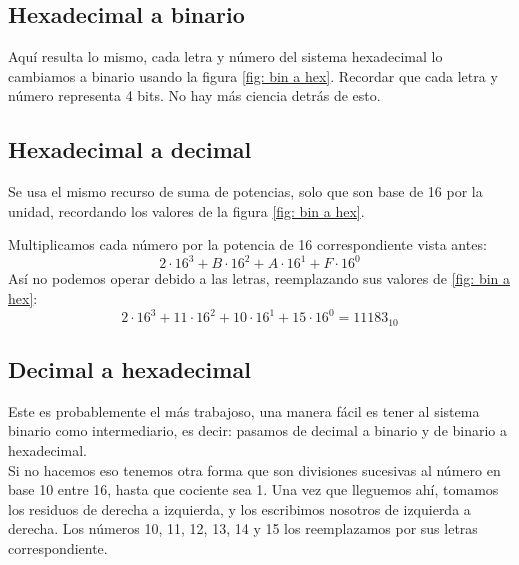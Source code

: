 \documentclass[
	12pt, %
	fleqn, %
	a4paper, %
]{LegrandOrangeBook}
\begin{document}
\subsection{Hexadecimal a binario}
Aquí resulta lo mismo, cada letra y número del sistema hexadecimal lo cambiamos a binario usando la figura \ref{fig: bin a hex}. Recordar que cada letra y número representa 4 bits. No hay más ciencia detrás de esto.
\subsection{Hexadecimal a decimal}
Se usa el mismo recurso de suma de potencias, solo que son base de 16 por la unidad, recordando los valores de la figura \ref{fig: bin a hex}.
\begin{example}
Multiplicamos cada número por la potencia de 16 correspondiente vista antes:
\begin{displaymath}
2\cdot 16^3 + B\cdot 16^2 + A\cdot 16^1 + F\cdot 16^0
\end{displaymath}
Así no podemos operar debido a las letras, reemplazando sus valores de \ref{fig: bin a hex}:
\begin{displaymath}
2\cdot 16^3 + 11\cdot 16^2 + 10\cdot 16^1 + 15\cdot 16^0=11 183_{10}
\end{displaymath}
\end{example}
\subsection{Decimal a hexadecimal}
Este es probablemente el más trabajoso, una manera fácil es tener al sistema binario como intermediario, es decir: pasamos de decimal a binario y de binario a hexadecimal.\\
Si no hacemos eso tenemos otra forma que son divisiones sucesivas al número en base 10 entre 16, hasta que cociente sea 1. Una vez que lleguemos ahí, tomamos los residuos de derecha a izquierda, y los escribimos nosotros de izquierda a derecha. Los números 10, 11, 12, 13, 14 y 15 los reemplazamos por sus letras correspondiente.
\newcount\total
\newcount\lasttotal
\newcount\targetbase
\end{document}
